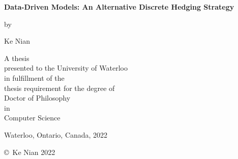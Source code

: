 \pagestyle{empty}

\begin{titlepage}
        \begin{center}
        \vspace*{1.0cm}

        \Huge
        {\bf Data-Driven Models: An Alternative Discrete Hedging Strategy }

        \vspace*{1.0cm}

        \normalsize
        by \\

        \vspace*{1.0cm}

        \Large
        Ke Nian \\

        \vspace*{3.0cm}

        \normalsize
        A thesis \\
        presented to the University of Waterloo \\
        in fulfillment of the \\
        thesis requirement for the degree of \\
        Doctor of Philosophy \\
        in \\
        Computer Science \\

        \vspace*{2.0cm}

        Waterloo, Ontario, Canada, 2022 \\

        \vspace*{1.0cm}

        \copyright\ Ke Nian 2022 \\
        \end{center}
\end{titlepage}

\pagestyle{plain}
\setcounter{page}{2}


